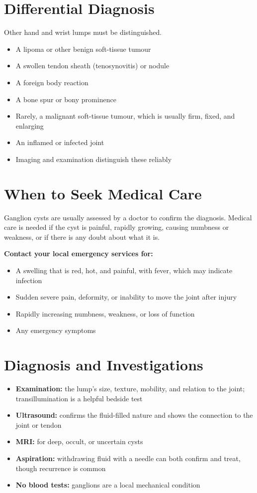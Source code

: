 \section*{Differential Diagnosis}
Other hand and wrist lumps must be distinguished.
\begin{itemize}
    \item A lipoma or other benign soft-tissue tumour
    \item A swollen tendon sheath (tenosynovitis) or nodule
    \item A foreign body reaction
    \item A bone spur or bony prominence
    \item Rarely, a malignant soft-tissue tumour, which is usually firm, fixed, and enlarging
    \item An inflamed or infected joint
    \item Imaging and examination distinguish these reliably
\end{itemize}

\section*{When to Seek Medical Care}
Ganglion cysts are usually assessed by a doctor to confirm the diagnosis. Medical care is needed if the cyst is painful, rapidly growing, causing numbness or weakness, or if there is any doubt about what it is.

\textbf{Contact your local emergency services for:}
\begin{itemize}
    \item A swelling that is red, hot, and painful, with fever, which may indicate infection
    \item Sudden severe pain, deformity, or inability to move the joint after injury
    \item Rapidly increasing numbness, weakness, or loss of function
    \item Any emergency symptoms
\end{itemize}

\section*{Diagnosis and Investigations}
\begin{itemize}
    \item \textbf{Examination:} the lump's size, texture, mobility, and relation to the joint; transillumination is a helpful bedside test
    \item \textbf{Ultrasound:} confirms the fluid-filled nature and shows the connection to the joint or tendon
    \item \textbf{MRI:} for deep, occult, or uncertain cysts
    \item \textbf{Aspiration:} withdrawing fluid with a needle can both confirm and treat, though recurrence is common
    \item \textbf{No blood tests:} ganglions are a local mechanical condition
\end{itemize}


